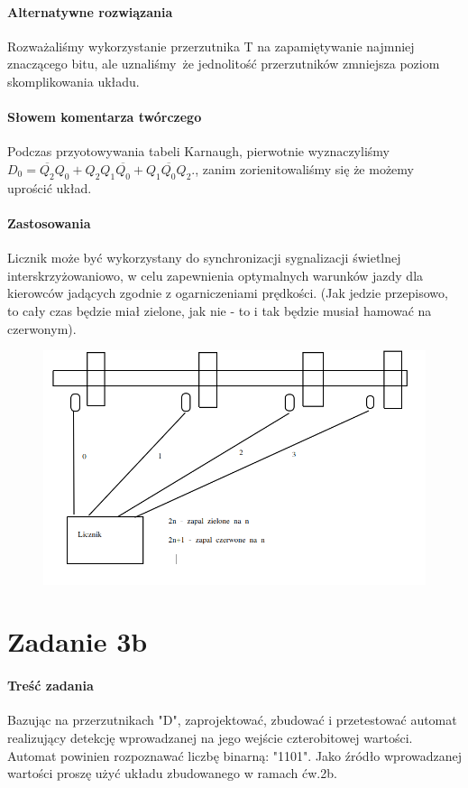 \documentclass{article}
\begin{document}
\paragraph{Alternatywne rozwiązania}
Rozważaliśmy wykorzystanie przerzutnika T na zapamiętywanie najmniej znaczącego bitu, ale uznaliśmy że jednolitość przerzutników zmniejsza poziom skomplikowania układu.
\paragraph{Słowem komentarza twórczego}
Podczas przyotowywania tabeli Karnaugh, pierwotnie wyznaczyliśmy $D_{0} = \overline{Q_{2}}Q_{0} + Q_{2}Q_{1}\overline{Q_{0}} + Q_{1}\overline{Q_{0}}Q_{2}$., zanim zorienitowaliśmy się że możemy uprościć układ.
\paragraph{Zastosowania}
Licznik może być wykorzystany do synchronizacji sygnalizacji świetlnej interskrzyżowaniowo, w celu zapewnienia optymalnych warunków jazdy dla kierowców jadących zgodnie z ogarniczeniami prędkości. (Jak jedzie przepisowo, to cały czas będzie miał zielone, jak nie - to i tak będzie musiał hamować na czerwonym).
\begin{figure}[H]
\includegraphics[width = \textwidth]{3a_swiatla}
\end{figure}
\section{Zadanie 3b}
\paragraph{Treść zadania}
Bazując na przerzutnikach "D", zaprojektować, zbudować i przetestować automat realizujący detekcję wprowadzanej na jego wejście czterobitowej wartości. Automat powinien rozpoznawać liczbę binarną: "1101". Jako źródło wprowadzanej wartości proszę użyć układu zbudowanego w ramach ćw.2b.
\newpage
\end{document}
